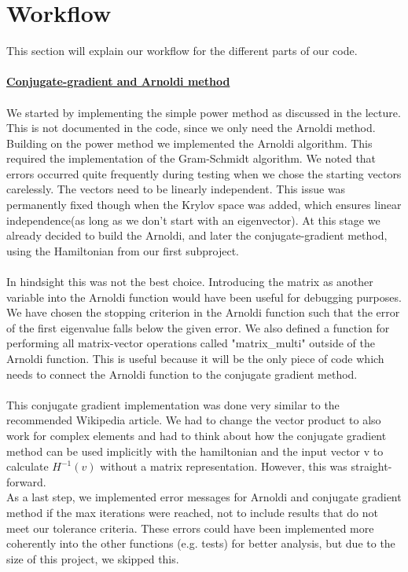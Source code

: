 \documentclass[11pt, letterpaper, onecolumn]{article}
\begin{document}
	
	
	\section{Workflow}
	This section will explain our workflow for the different parts of our code.
    \\
    \\
        \underline{\textbf{Conjugate-gradient and Arnoldi method}}
    \\
    \\
    We started by implementing the simple power method as discussed in the lecture. This is not documented in the code, since we only need the Arnoldi method. Building on the power method we implemented the Arnoldi algorithm. This required the implementation of the Gram-Schmidt algorithm. We noted that errors occurred quite frequently during testing when we chose the starting vectors carelessly. The vectors need to be linearly independent. This issue was permanently fixed though when the Krylov space was added, which ensures linear independence(as long as we don't start with an eigenvector). At this stage we already decided to build the Arnoldi, and later the conjugate-gradient method, using the Hamiltonian from our first subproject. \\
    \\
    In hindsight this was not the best choice. Introducing the matrix as another variable into the Arnoldi function would have been useful for debugging purposes. We have chosen the stopping criterion in the Arnoldi function such that the error of the first eigenvalue falls below the given error. We also defined a function for performing all matrix-vector operations called "matrix\_multi" outside of the Arnoldi function. This is useful because it will be the only piece of code which needs to connect the Arnoldi function to the conjugate gradient method.\\
    \\
    This conjugate gradient implementation was done very similar to the recommended Wikipedia article. We had to change the vector product to also work for complex elements and had to think about how the conjugate gradient method can be used implicitly with the hamiltonian and the input vector v to calculate $H^{-1}(v)$ without a matrix representation. However, this was straight-forward.\\
    As a last step, we implemented error messages for Arnoldi and conjugate gradient method if the max iterations were reached, not to include results that do not meet our tolerance criteria. These errors could have been implemented more coherently into the other functions (e.g. tests) for better analysis, but due to the size of this project, we skipped this.
\end{document}
